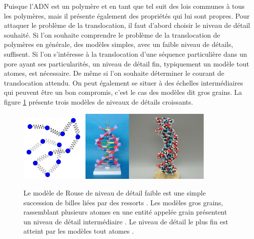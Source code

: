Puisque l'ADN est un polymère  et en tant que tel suit des lois communes à tous les polymères, mais il présente également des propriétés qui lui sont propres. Pour attaquer le problème de la translocation, il faut d'abord choisir le niveau de détail souhaité. Si l'on souhaite comprendre le problème de la translocation de polymères en générale, des modèles simples, avec un faible niveau de détails, suffisent. Si l'on s'intéresse à la translocation d'une séquence particulière dans un pore ayant ses particularités, un niveau de détail fin, typiquement un modèle tout atomes, est nécessaire. De même si l'on souhaite déterminer le courant de translocation attendu. On peut également se situer à des échelles intermédiaires qui peuvent être un bon compromis, c'est le cas des modèles dit gros grains. La figure \ref{echellemodeles} présente trois modèles de niveaux de détails croissants.

\begin{figure}[H]
\begin{center}
\includegraphics[width=0.3\textwidth]{beadspring.jpg}\includegraphics[width=0.21\textwidth]{coarsegraindnamodel.jpg}\includegraphics[width=0.36\textwidth]{fullatom.jpg}

\caption[Echelles de modèles]{Le modèle de Rouse \cite{Rouse1953} de niveau de détail faible est une simple succession de billes liées par des ressorts \cite{wikirouse}. Les modèles gros grains, rassemblant plusieurs atomes en une entité appelée grain présentent un niveau de détail intermédiaire \cite{coarsegrainmodna}. Le niveau de détail le plus fin est atteint par les modèles tout atomes \cite{fullatomdnamodel}.}
\label{echellemodeles}
\end{center}
\end{figure}



